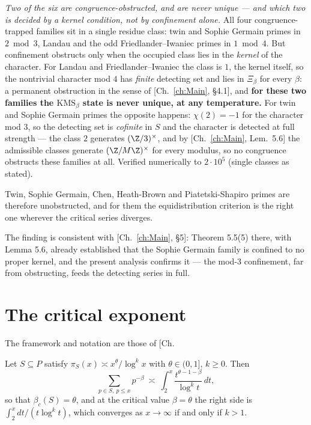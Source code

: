 \begin{summary}
\emph{Two of the six are congruence-obstructed, and are never unique --- and which two is
decided by a kernel condition, not by confinement alone.} All four congruence-trapped
families sit in a single residue class: twin and Sophie Germain primes in $2\bmod3$, Landau
and the odd Friedlander--Iwaniec primes in $1\bmod4$. But confinement obstructs only when the
occupied class lies in the \emph{kernel} of the character. For Landau and
Friedlander--Iwaniec the class is $1$, the kernel itself, so the nontrivial character mod $4$
has \emph{finite} detecting set and lies in $\Xi_\beta$ for every $\beta$: a permanent
obstruction in the sense of [Ch.~\ref{ch:Main}, \S4.1], and \textbf{for these two families the
$\mathrm{KMS}_\beta$ state is never unique, at any temperature.} For twin and Sophie Germain
primes the opposite happens: $\chi(2)=-1$ for the character mod $3$, so the detecting set is
\emph{cofinite} in $S$ and the character is detected at full strength --- the class $2$
generates $(\Z/3)^\times$, and by [Ch.~\ref{ch:Main}, Lem.~5.6] the admissible classes generate
$(\Z/M\Z)^\times$ for every modulus, so no congruence obstructs these families at all.
Verified numerically to $2\cdot10^5$ (single classes as stated).

Twin, Sophie Germain, Chen, Heath-Brown and Piatetski-Shapiro primes are therefore
unobstructed, and for them the equidistribution criterion is the right one wherever the
critical series diverges.

The finding is consistent with [Ch.~\ref{ch:Main}, \S5]: Theorem 5.5(5) there, with Lemma 5.6,
already established that the Sophie Germain family is confined to no proper kernel, and the
present analysis confirms it --- the mod-$3$ confinement, far from obstructing, feeds the
detecting series in full.
\end{summary}


\section{The critical exponent}

The framework and notation are those of [Ch.\begin{proposition}\label{XXIV:prop:abel}
Let $S\subseteq P$ satisfy $\pi_S(x)\asymp x^\theta/\log^kx$ with $\theta\in(0,1]$, $k\ge0$.
Then
\begin{equation}\label{XXIV:eq:abel}
\sum_{p\in S,\ p\le x}p^{-\beta}\ \asymp\ \int_2^x\frac{t^{\theta-1-\beta}}{\log^kt}\,dt ,
\end{equation}
so that $\beta_c(S)=\theta$, and at the critical value $\beta=\theta$ the right side is
$\int_2^x dt/(t\log^kt)$, which converges as $x\to\infty$ if and only if $k>1$.
\end{proposition}

